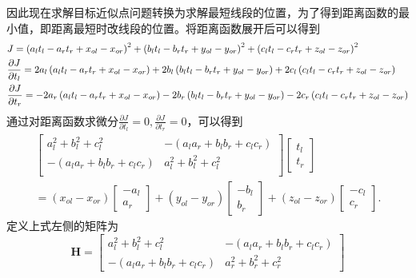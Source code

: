 因此现在求解目标近似点问题转换为求解最短线段的位置，为了得到距离函数的最小值，即距离最短时改线段的位置。将距离函数展开后可以得到
\begin{equation}  	
\begin{gathered}
J = {\left( {{a_l}{t_l} - {a_r}{t_r} + {x_{ol}} - {x_{or}}} \right)^2} + {\left( {{b_l}{t_l} - {b_r}{t_r} + {y_{ol}} - {y_{or}}} \right)^2} + {\left( {{c_l}{t_l} - {c_r}{t_r} + {z_{ol}} - {z_{or}}} \right)^2} \hfill \\
\frac{{\partial J}}{{\partial {t_l}}} = 2{a_l}\left( {{a_l}{t_l} - {a_r}{t_r} + {x_{ol}} - {x_{or}}} \right) + 2{b_l}\left( {{b_l}{t_l} - {b_r}{t_r} + {y_{ol}} - {y_{or}}} \right) + 2{c_l}\left( {{c_l}{t_l} - {c_r}{t_r} + {z_{ol}} - {z_{or}}} \right) \hfill \\
\frac{{\partial J}}{{\partial {t_r}}} =  - 2{a_r}\left( {{a_l}{t_l} - {a_r}{t_r} + {x_{ol}} - {x_{or}}} \right) - 2{b_r}\left( {{b_l}{t_l} - {b_r}{t_r} + {y_{ol}} - {y_{or}}} \right) - 2{c_r}\left( {{c_l}{t_l} - {c_r}{t_r} + {z_{ol}} - {z_{or}}} \right) \hfill \\ 
\end{gathered}
\end{equation}
通过对距离函数求微分$\frac{{\partial J}}{{\partial {t_l}}} = 0,\frac{{\partial J}}{{\partial {t_r}}} = 0$，可以得到
\begin{align}  	
\begin{bmatrix}
a_l^2 + b_l^2 + c_l^2       & -(a_la_r + b_lb_r + c_lc_r) \\
-(a_la_r + b_lb_r + c_lc_r) & a_l^2 + b_l^2 + c_l^2 \\    
\end{bmatrix}	
\begin{bmatrix}
t_l \\ 
t_r 
\end{bmatrix} \nonumber \\
=(x_{ol}-x_{or})
\begin{bmatrix}
-a_l \\
a_r 
\end{bmatrix}
+(y_{ol}-y_{or})
\begin{bmatrix}
-b_l \\
b_r 
\end{bmatrix} \nonumber 
+(z_{ol}-z_{or})
\begin{bmatrix}
-c_l \\
c_r
\end{bmatrix}.
\end{align}
定义上式左侧的矩阵为
\begin{equation} 
{\mathbf{H}} = \left[ {\begin{array}{*{20}{c}}
	{a_l^2 + b_l^2 + c_l^2}&{ - \left( {{a_l}{a_r} + {b_l}{b_r} + {c_l}{c_r}} \right)} \\ 
	{ - \left( {{a_l}{a_r} + {b_l}{b_r} + {c_l}{c_r}} \right)}&{a_r^2 + b_r^2 + c_r^2} 
	\end{array}} \right]
\end{equation}
